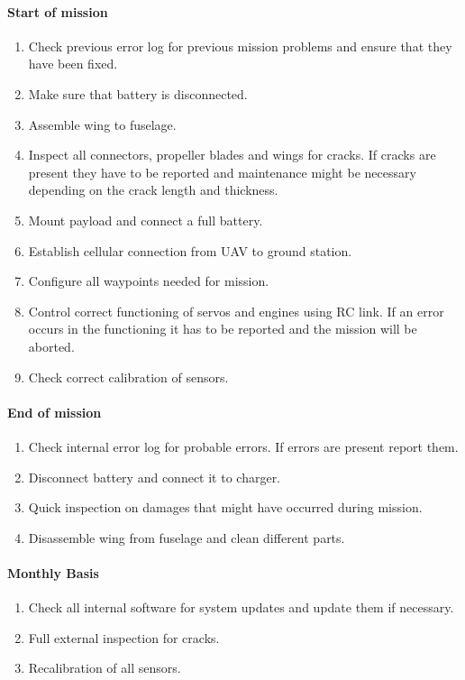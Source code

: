 \paragraph{Start of mission}     \begin{enumerate}
    \item Check previous error log for previous mission problems and ensure that they have been fixed. 
    \item Make sure that battery is disconnected. 
    \item Assemble wing to fuselage.
    \item Inspect all connectors, propeller blades and wings for cracks. If cracks are present they have to be reported and maintenance might be necessary depending on the crack length and thickness. 
    \item Mount payload and connect a full battery.
    \item Establish cellular connection from UAV to ground station.
    \item Configure all waypoints needed for mission. 
    \item Control correct functioning of servos and engines using RC link. If an error occurs in the functioning it has to be reported and the mission will be aborted.
    \item Check correct calibration of sensors.
\end{enumerate}

\paragraph{End of mission} 
\begin{enumerate}
    \item Check internal error log for probable errors. If errors are present report them. 
    \item Disconnect battery and connect it to charger.
    \item Quick inspection on damages that might have occurred during mission.
    \item Disassemble wing from fuselage and clean different parts.
\end{enumerate}

\paragraph{Monthly Basis}
\begin{enumerate}
    \item Check all internal software for system updates and update them if necessary. 
    \item Full external inspection for cracks.
    \item Recalibration of all sensors.
\end{enumerate}






















